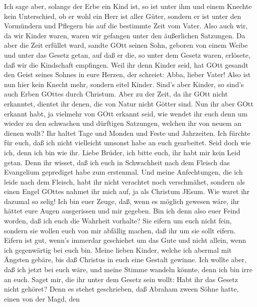 Ich sage aber, solange der Erbe ein Kind ist, so ist unter
ihm und einem Knechte kein Unterschied, ob er wohl ein Herr ist aller
Güter,  sondern er ist unter den Vormündern und Pflegern bis
auf die bestimmte Zeit vom Vater.  Also auch wir, da wir
Kinder waren, waren wir gefangen unter den äußerlichen Satzungen.
 Da aber die Zeit erfüllet ward, sandte GOtt seinen Sohn,
geboren von einem Weibe und unter das Gesetz getan,  auf daß
er die, so unter dem Gesetz waren, erlösete, daß wir die Kindschaft
empfingen.  Weil ihr denn Kinder seid, hat GOtt gesandt den
Geist seines Sohnes in eure Herzen, der schreiet: Abba, lieber Vater!
 Also ist nun hier kein Knecht mehr, sondern eitel Kinder.
Sind's aber Kinder, so sind's auch Erben GOttes durch Christum.
 Aber zu der Zeit, da ihr GOtt nicht erkanntet, dientet ihr
denen, die von Natur nicht Götter sind.  Nun ihr aber GOtt
erkannt habt, ja vielmehr von GOtt erkannt seid, wie wendet ihr euch
denn um wieder zu den schwachen und dürftigen Satzungen, welchen ihr von
neuem an dienen wollt?  Ihr haltet Tage und Monden und
Feste und Jahrzeiten.  Ich fürchte für euch, daß ich nicht
vielleicht umsonst habe an euch gearbeitet.  Seid doch wie
ich, denn ich bin wie ihr. Liebe Brüder, ich bitte euch, ihr habt mir
kein Leid getan.  Denn ihr wisset, daß ich euch in
Schwachheit nach dem Fleisch das Evangelium geprediget habe zum
erstenmal.  Und meine Anfechtungen, die ich leide nach dem
Fleisch, habt ihr nicht verachtet noch verschmähet, sondern als einen
Engel GOttes nahmet ihr mich auf, ja als Christum JEsum. 
Wie waret ihr dazumal so selig! Ich bin euer Zeuge, daß, wenn es möglich
gewesen wäre, ihr hättet eure Augen ausgerissen und mir gegeben.
 Bin ich denn also euer Feind worden, daß ich euch die
Wahrheit vorhalte?  Sie eifern um euch nicht fein, sondern
sie wollen euch von mir abfällig machen, daß ihr um sie sollt eifern.
 Eifern ist gut, wenn's immerdar geschiehet um das Gute und
nicht allein, wenn ich gegenwärtig bei euch bin.  Meine
lieben Kinder, welche ich abermal mit Ängsten gebäre, bis daß Christus
in euch eine Gestalt gewinne.  Ich wollte aber, daß ich
jetzt bei euch wäre, und meine Stimme wandeln könnte, denn ich bin irre
an euch.  Saget mir, die ihr unter dem Gesetz sein wollt:
Habt ihr das Gesetz nicht gehöret?  Denn es stehet
geschrieben, daß Abraham zween Söhne hatte, einen von der Magd, den
